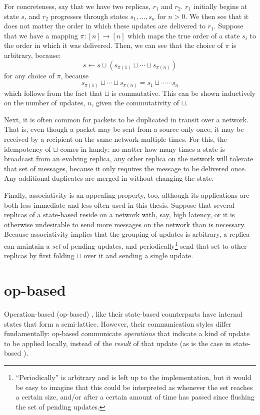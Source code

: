 For concreteness, say that we have two replicas, $r_1$ and $r_2$. $r_1$
initially begins at state $s$, and $r_2$ progresses through states $s_1, \ldots,
s_n$ for $n > 0$. We then see that it does not matter the order in which these
updates are delivered to $r_1$. Suppose that we have a mapping $\pi : [n] \to
[n]$ which maps the true order of a state $s_i$ to the order in which it was
delivered. Then, we can see that the choice of $\pi$ is arbitrary, because:
\[
  s \gets s \sqcup (s_{\pi(1)} \sqcup \cdots \sqcup s_{\pi(n)})
\]
for any choice of $\pi$, because
\[
  s_{\pi(1)} \sqcup \cdots \sqcup s_{\pi(n)} = s_1 \sqcup \cdots \cdots s_n
\]
which follows from the fact that $\sqcup$ is commutative. This can be shown
inductively on the number of updates, $n$, given the commutativity of $\sqcup$.

Next, it is often common for packets to be duplicated in transit over a network.
That is, even though a packet may be sent from a source only once, it may be
received by a recipient on the same network multiple times. For this, the
idempotency of $\sqcup$ comes in handy: no matter how many times a state is
broadcast from an evolving replica, any other replica on the network will
tolerate that set of messages, because it only requires the message to be
delivered once. Any additional duplicates are merged in without changing the
state.

Finally, associativity is an appealing property, too, although its applications
are both less immediate and less often-used in this thesis. Suppose that several
replicas of a state-based \CRDT reside on a network with, say, high latency, or
it is otherwise undesirable to send more messages on the network than is
necessary. Because associativity implies that the grouping of updates is
arbitrary, a replica can maintain a \textit{set} of pending updates, and
periodically\footnote{``Periodically'' is arbitrary and is left up to the
implementation, but it would be easy to imagine that this could be interpreted
as whenever the set reaches a certain size, and/or after a certain amount of
time has passed since flushing the set of pending updates.} send that set to
other replicas by first folding $\sqcup$ over it and sending a single update.

\section{op-based \CRDTs}
\label{sec:op-based-crdts}

Operation-based (op-based) \CRDTs, like their state-based counterparts have
internal states that form a semi-lattice. However, their communication styles
differ fundamentally: op-based \CRDTs communicate \textit{operations} that
indicate a kind of update to be applied locally, instead of the \textit{result}
of that update (as is the case in state-based \CRDTs).

